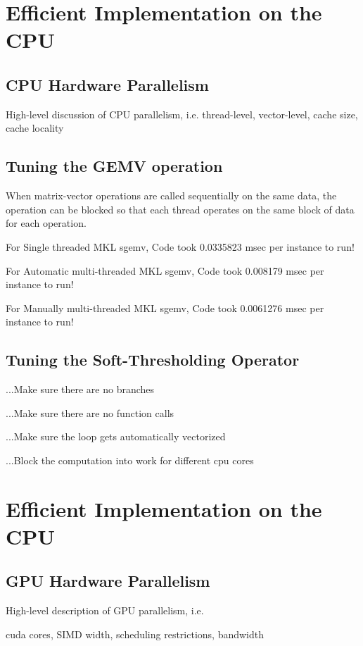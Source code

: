 \documentclass[10pt,twocolumn,letterpaper]{article}
\begin{document}
\section{Efficient Implementation on the CPU}
\subsection{CPU Hardware Parallelism}
High-level discussion of CPU parallelism, i.e.
thread-level, vector-level, cache size, cache locality
\subsection{Tuning the GEMV operation}
When matrix-vector operations are called sequentially on the same data,
the operation can be blocked so that each thread operates on the same block of data for each operation.

For Single threaded MKL sgemv, Code took          0.0335823 msec per instance to run!

For Automatic multi-threaded MKL sgemv, Code took 0.008179 msec per instance to run!

For Manually multi-threaded MKL sgemv, Code took  0.0061276 msec per instance to run!

\subsection{Tuning the Soft-Thresholding Operator}
...Make sure there are no branches

...Make sure there are no function calls

...Make sure the loop gets automatically vectorized

...Block the computation into work for different cpu cores

\section{Efficient Implementation on the CPU}
\subsection{GPU Hardware Parallelism}
High-level description of GPU parallelism, i.e.

cuda cores, SIMD width, scheduling restrictions, bandwidth
\end{document}
